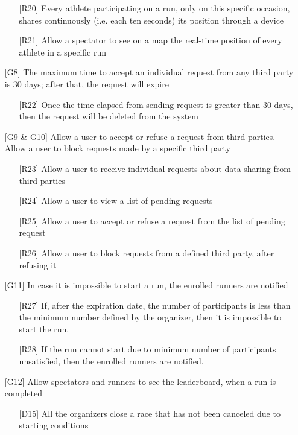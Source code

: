 \begin{itemize}
\begin{itemize}
	\item[{[R20]}] Every athlete participating on a run, only on this specific occasion, shares continuously (i.e. each ten seconds) its position through a device
	\item[{[R21]}] Allow a spectator to see on a map the real-time position of every athlete in a specific run
	\end{itemize}
\item[{[G8]}] The maximum time to accept an individual request from any third party is 30 days; after that, the request will expire
	\begin{itemize}
	\item[{[R22]}] Once the time elapsed from sending request is greater than 30 days, then the request will be deleted from the system
	\end{itemize}
\item[{[G9 \& G10]}] Allow a user to accept or refuse a request from third parties. Allow a user to block requests made by a specific third party
	\begin{itemize}
	\item[{[R23]}] Allow a user to receive individual requests about data sharing from third parties
	\item[{[R24]}] Allow a user to view a list of pending requests
	\item[{[R25]}] Allow a user to accept or refuse a request from the list of pending request
	\item[{[R26]}] Allow a user to block requests from a defined third party, after refusing it
	\end{itemize}	
\item[{[G11]}] In case it is impossible to start a run, the enrolled runners are notified
	\begin{itemize}
	\item[{[R27]}] If, after the expiration date, the number of participants is less than the minimum number defined by the organizer, then it is impossible to start the run.
	\item[{[R28]}] If the run cannot start due to minimum number of participants unsatisfied, then the enrolled runners are notified.
	\end{itemize}
\item[{[G12]}] Allow spectators and runners to see the leaderboard, when a run is completed
	\begin{itemize}
	\item[{[D15]}]All the organizers close a race that has not been canceled due to starting conditions

\end{itemize}
\end{itemize}
